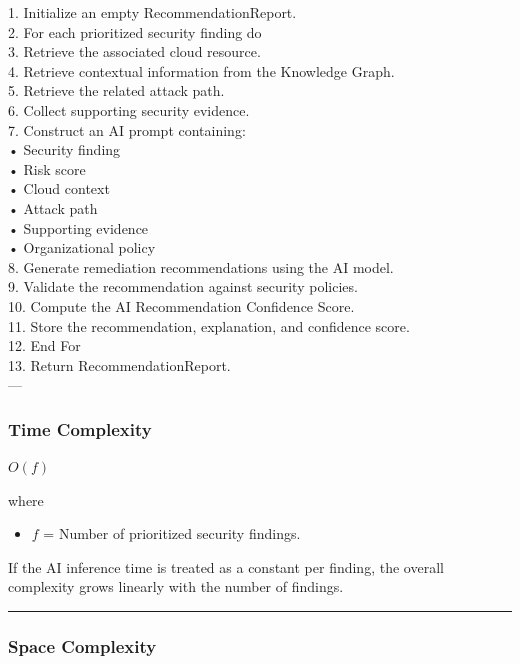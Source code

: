 1. Initialize an empty RecommendationReport.\\
2. For each prioritized security finding do\\
3. Retrieve the associated cloud resource.\\
4. Retrieve contextual information from the Knowledge Graph.\\
5. Retrieve the related attack path.\\
6. Collect supporting security evidence.\\
7. Construct an AI prompt containing:\\
• Security finding\\
• Risk score\\
• Cloud context\\
• Attack path\\
• Supporting evidence\\
• Organizational policy\\
8. Generate remediation recommendations using the AI model.\\
9. Validate the recommendation against security policies.\\
10. Compute the AI Recommendation Confidence Score.\\
11. Store the recommendation, explanation, and confidence score.\\
12. End For\\
13. Return RecommendationReport.\\
---

\subsubsection{Time Complexity}

$O(f)$

where

\begin{itemize}
\tightlist
\item
$f$ = Number of prioritized security findings.
\end{itemize}

If the AI inference time is treated as a constant per finding, the overall complexity grows linearly with the number of findings.

\begin{center}\rule{0.5\linewidth}{0.5pt}\end{center}

\subsubsection{Space Complexity}

